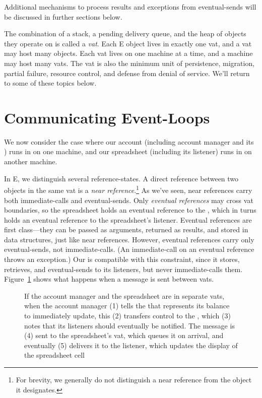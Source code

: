 \documentclass{llncs}
\begin{document}
Additional mechanisms to process results and exceptions from
eventual-sends will be discussed in further sections below.

The combination of a stack, a pending delivery queue, and the heap of
objects they operate on is called a \emph{vat}.  Each E object lives
in exactly one vat, and a vat may host many objects.  Each vat lives
on one machine at a time, and a machine may host many vats. The vat is
also the minimum unit of persistence, migration, partial failure,
resource control, and defense from denial of service. We'll return to
some of these topics below.

\section{Communicating Event-Loops}

We now consider the case where our account (including account manager
and its ) runs in  on one machine, and our
spreadsheet (including its listener) runs in  on another
machine.

In E, we distinguish several reference-states. A direct reference
between two objects in the same vat is a \emph{near
reference}.\footnote{
%
For brevity, we generally do not distinguish a near reference from the
object it designates.}
%
As we've seen, near references carry both immediate-calls and
eventual-sends. Only \emph{eventual references} may cross vat
boundaries, so the spreadsheet holds an eventual reference to the
, which in turns holds an eventual reference to the
spreadsheet's listener. Eventual references are first class---they can
be passed as arguments, returned as results, and stored in data
structures, just like near references. However, eventual references
carry only eventual-sends, not immediate-calls. (An immediate-call on
an eventual reference throws an exception.) Our  is
compatible with this constraint, since it stores, retrieves, and
eventual-sends to its listeners, but never immediate-calls them.
Figure~\ref{fig:2vat} shows what happens when a message is sent
between vats.

\begin{figure}
\centerline{}
\caption{If the account manager and the spreadsheet are in separate
  vats, when the account manager (1) tells the 
  that represents its balance to immediately update, this (2)
  transfers control to the , which (3) notes that
  its listeners should eventually be notified. The message is (4) sent
  to the spreadsheet's vat, which queues it on arrival, and eventually
  (5) delivers it to the listener, which updates the display of the
  spreadsheet cell}
\label{fig:2vat}
\end{figure}
\end{document}
